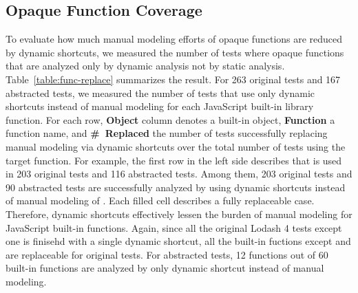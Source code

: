 \subsection{Opaque Function Coverage}
To evaluate how much manual modeling efforts of opaque functions
are reduced by dynamic shortcuts, we measured the number of tests where
opaque functions that are analyzed only by dynamic analysis not by
static analysis.  Table~\ref{table:func-replace} summarizes the result.
For 263 original tests and 167 abstracted tests, we measured the
number of tests that use only dynamic shortcuts instead of manual modeling
for each JavaScript built-in library function.  For each row,
\textbf{Object} column denotes a built-in object, \textbf{Function} a function
name, and \textbf{\#~Replaced} the number of tests successfully replacing manual
modeling via dynamic shortcuts over the total number of tests using the target function.
For example, the first row in the left side describes that  is used in
203 original tests and 116 abstracted tests.  Among them, 203 original
tests and 90 abstracted tests are successfully analyzed by using dynamic shortcuts
instead of manual modeling of .  Each filled cell describes
a fully replaceable case.  Therefore, dynamic
shortcuts effectively lessen the burden of manual modeling for JavaScript
built-in functions.  Again, since all the original Lodash 4 tests except one
is finisehd with a single dynamic shortcut, all the built-in fuctions
except  and  are replaceable
for original tests.  For abstracted tests, 12 functions out of 60 built-in
functions are analyzed by only dynamic shortcut instead of manual modeling.
